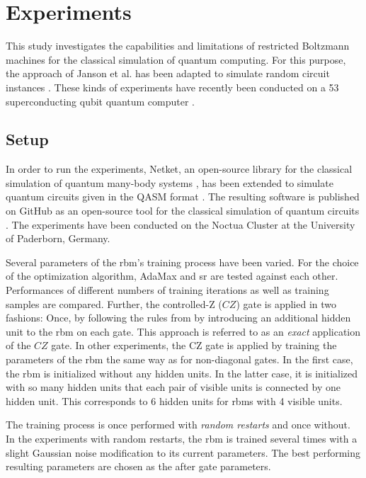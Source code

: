\chapter{Experiments}
\label{sec:experiments}

This study investigates the capabilities and limitations of restricted Boltzmann machines
for the classical simulation of quantum computing. For this purpose, the approach of Janson 
et al. \cite{jnsson2018neuralnetwork} has been adapted to simulate random circuit instances \cite{Boixo2018supremacy}.
These kinds of experiments have recently been conducted on a 53 superconducting qubit quantum computer \cite{martines2019supremacy}.

\section{Setup}
\label{sec:setup}

In order to run the experiments, Netket, an open-source library for the classical simulation of quantum 
many-body systems \cite{netket2019}, has been extended to simulate quantum circuits given in the QASM format \cite{cross2017open}. The resulting 
software is published on GitHub as an open-source tool for the classical simulation 
of quantum circuits \cite{NQS2020}. The experiments have been conducted on the Noctua Cluster at the University of Paderborn, Germany.

Several parameters of the \gls{rbm}'s training process have been varied. For the choice of the optimization algorithm, AdaMax and 
\gls{sr} are tested against each other. Performances of different numbers of training iterations 
as well as training samples are compared. Further, the controlled-Z ($CZ$) gate is applied in two fashions: Once, 
by following the rules from \cite{jnsson2018neuralnetwork} by introducing an additional hidden unit to the \gls{rbm} on each gate. 
This approach is referred to as an \textit{exact} application of the $CZ$ gate. In other 
experiments, the CZ gate is applied by training the parameters of the \gls{rbm} the same way as for 
non-diagonal gates. In the first case, the \gls{rbm} is initialized without any hidden units. In the latter 
case, it is initialized with so many hidden units that each pair of visible units is connected 
by one hidden unit. This corresponds to 6 hidden units for \gls{rbm}s with 4 visible units.

The training process is once performed with \textit{random restarts} and once without. 
In the experiments with random restarts, the \gls{rbm} is trained several times with a slight Gaussian noise modification to its 
current parameters. The best performing resulting parameters are chosen as the after gate parameters. 


